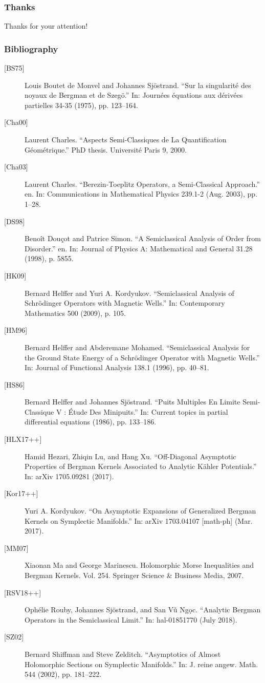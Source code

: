 \documentclass[mathserif]{beamer}
\begin{document}
  \begin{frame}
    \frametitle{Thanks}
    \centering 
    {\Large Thanks for your attention!}
  \end{frame}
  

  \begin{frame}[allowframebreaks]
    \frametitle{Bibliography}
        {\footnotesize
          \begin{description}
            \item[{[BS75]}] Louis Boutet de Monvel and Johannes
              Sjöstrand.  “Sur la singularité des noyaux de Bergman et
              de Szegö.” In: Journées équations aux dérivées
              partielles 34-35 (1975), pp. 123--164.
        \item[{[Cha00]}] Laurent Charles. “Aspects Semi-Classiques de La Quantification Géométrique.” PhD thesis. Université Paris 9, 2000.
        \item[{[Cha03]}] Laurent Charles. “Berezin-Toeplitz Operators, a Semi-Classical Approach.” en. In: Communications in Mathematical Physics 239.1-2
(Aug. 2003), pp. 1–28.
        \item[{[DS98]}] Benoît Douçot and Patrice Simon. “A Semiclassical Analysis of Order
from Disorder.” en. In: Journal of Physics A: Mathematical and General
31.28 (1998), p. 5855.
\item[{[HK09]}] Bernard Helffer and Yuri A. Kordyukov. “Semiclassical Analysis of
Schrödinger Operators with Magnetic Wells.” In: Contemporary Mathematics 500 (2009), p. 105.
\item[{[HM96]}] Bernard Helffer and Abderemane Mohamed. “Semiclassical Analysis for
the Ground State Energy of a Schrödinger Operator with Magnetic
Wells.” In: Journal of Functional Analysis 138.1 (1996), pp. 40–81.
\item[{[HS86]}] Bernard Helffer and Johannes Sjöstrand. “Puits Multiples En Limite
Semi-Classique V : Étude Des Minipuits.” In: Current topics in partial
differential equations (1986), pp. 133–186.
\item[{[HLX17++]}] Hamid Hezari, Zhiqin Lu, and Hang Xu. “Off-Diagonal Asymptotic
Properties of Bergman Kernels Associated to Analytic Kähler Potentials.” In: arXiv 1705.09281 (2017).
\item[{[Kor17++]}] Yuri A. Kordyukov. “On Asymptotic Expansions of Generalized Bergman
Kernels on Symplectic Manifolds.” In: arXiv 1703.04107 [math-ph]
(Mar. 2017).
\item[{[MM07]}] Xiaonan Ma and George Marinescu. Holomorphic Morse Inequalities
and Bergman Kernels. Vol. 254. Springer Science \& Business Media,
2007.
\item[{[RSV18++]}] Ophélie Rouby, Johannes Sjöstrand, and San Vũ Ng\d{o}c. “Analytic
Bergman Operators in the Semiclassical Limit.” In: hal-01851770 (July
2018).
\item[{[SZ02]}] Bernard Shiffman and Steve Zelditch. “Asymptotics of Almost Holomorphic Sections on Symplectic Manifolds.” In: J. reine angew. Math.
544 (2002), pp. 181–222.
        \end{description}
        }
      \end{frame}
\end{document}

